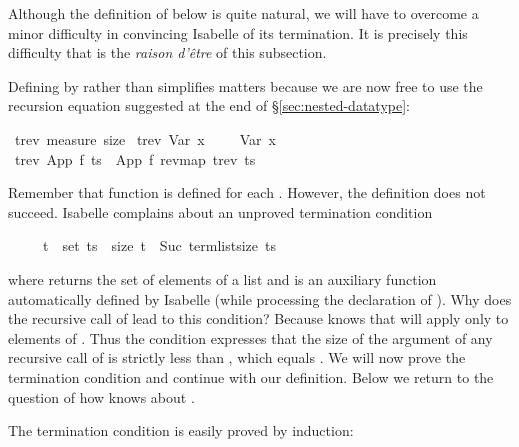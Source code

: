 %
\begin{isabellebody}%
\def\isabellecontext{Nested{\isadigit{1}}}%
%
\isadelimtheory
%
\endisadelimtheory
%
\isatagtheory
%
\endisatagtheory
{\isafoldtheory}%
%
\isadelimtheory
%
\endisadelimtheory
%
\begin{isamarkuptext}%
\noindent
Although the definition of  below is quite natural, we will have
to overcome a minor difficulty in convincing Isabelle of its termination.
It is precisely this difficulty that is the \textit{raison d'\^etre} of
this subsection.

Defining  by  rather than 
simplifies matters because we are now free to use the recursion equation
suggested at the end of \S\ref{sec:nested-datatype}:%
\end{isamarkuptext}%
\isamarkuptrue%
\isamarkupfalse%
\ trev\ {\isachardoublequoteopen}measure\ size{\isachardoublequoteclose}\isanewline
\ {\isachardoublequoteopen}trev\ {\isacharparenleft}Var\ x{\isacharparenright}\ \ \ \ {\isacharequal}\ Var\ x{\isachardoublequoteclose}\isanewline
\ {\isachardoublequoteopen}trev\ {\isacharparenleft}App\ f\ ts{\isacharparenright}\ {\isacharequal}\ App\ f\ {\isacharparenleft}rev{\isacharparenleft}map\ trev\ ts{\isacharparenright}{\isacharparenright}{\isachardoublequoteclose}%
\begin{isamarkuptext}%
\noindent
Remember that function  is defined for each .
However, the definition does not succeed. Isabelle complains about an
unproved termination condition
\begin{isabelle}%
\ \ \ \ \ t\ {\isasymin}\ set\ ts\ {\isasymlongrightarrow}\ size\ t\ {\isacharless}\ Suc\ {\isacharparenleft}term{\isacharunderscore}list{\isacharunderscore}size\ ts{\isacharparenright}%
\end{isabelle}
where  returns the set of elements of a list
and  is an auxiliary
function automatically defined by Isabelle
(while processing the declaration of ).  Why does the
recursive call of  lead to this
condition?  Because  knows that 
will apply  only to elements of . Thus the 
condition expresses that the size of the argument  of any
recursive call of  is strictly less than ,
which equals .  We will now prove the termination condition and
continue with our definition.  Below we return to the question of how
 knows about .

The termination condition is easily proved by induction:%
\end{isamarkuptext}%
\isamarkuptrue%
%
\isadelimtheory
%
\endisadelimtheory
%
\isatagtheory
%
\endisatagtheory
{\isafoldtheory}%
%
\isadelimtheory
%
\endisadelimtheory
\end{isabellebody}%
